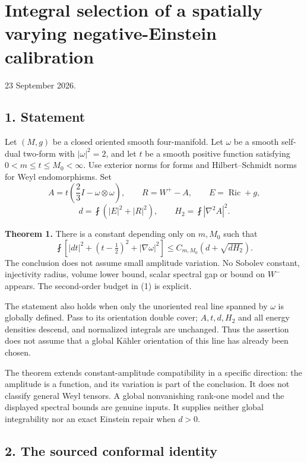 \documentclass[
  11pt,
]{article}
\author{}
\date{23 September 2026}
\begin{document}
\hypertarget{integral-selection-of-a-spatially-varying-negative-einstein-calibration}{%
\section{Integral selection of a spatially varying negative-Einstein
calibration}\label{integral-selection-of-a-spatially-varying-negative-einstein-calibration}}

23 September 2026.

\hypertarget{statement}{%
\subsection{1. Statement}\label{statement}}

Let \((M,g)\) be a closed oriented smooth four-manifold. Let \(\omega\)
be a smooth self-dual two-form with \(|\omega|^2=2\), and let \(t\) be a
smooth positive function satisfying \(0<m\le t\le M_0<\infty\). Use
exterior norms for forms and Hilbert--Schmidt norms for Weyl
endomorphisms. Set \[
 A=t\left(\frac23 I-\omega\otimes\omega\right),\qquad
 R=W^+-A,\qquad E=\operatorname{Ric}+g,
\] \[
 d=\fint(|E|^2+|R|^2),\qquad
 H_2=\fint|\nabla^2 A|^2.
\tag{1}
\]

\textbf{Theorem 1.} There is a constant depending only on \(m,M_0\) such
that \[
 \boxed{\quad
 \fint\left[|dt|^2+(t-\tfrac12)^2+|\nabla\omega|^2\right]
 \le C_{m,M_0}\left(d+\sqrt{dH_2}\right).
 \quad}                                                     \tag{2}
\] The conclusion does not assume small amplitude variation. No Sobolev
constant, injectivity radius, volume lower bound, scalar spectral gap or
bound on \(W^-\) appears. The second-order budget in (1) is explicit.

The statement also holds when only the unoriented real line spanned by
\(\omega\) is globally defined. Pass to its orientation double cover;
\(A,t,d,H_2\) and all energy densities descend, and normalized integrals
are unchanged. Thus the assertion does not assume that a global Kähler
orientation of this line has already been chosen.

The theorem extends constant-amplitude compatibility in a specific
direction: the amplitude is a function, and its variation is part of the
conclusion. It does not classify general Weyl tensors. A global
nonvanishing rank-one model and the displayed spectral bounds are
genuine inputs. It supplies neither global integrability nor an exact
Einstein repair when \(d>0\).

\hypertarget{the-sourced-conformal-identity}{%
\subsection{2. The sourced conformal
identity}\label{the-sourced-conformal-identity}}
\end{document}

